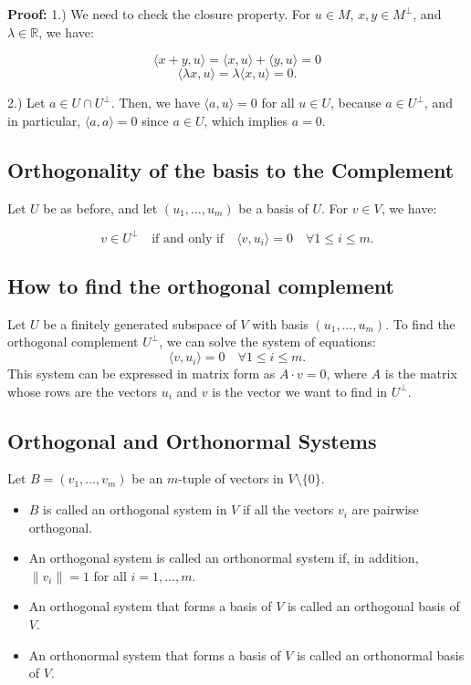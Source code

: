 \textbf{Proof:}
1.) We need to check the closure property. For \( u \in M \), \( x, y \in M^\perp \), and \( \lambda \in \mathbb{R} \), we have:

\[
\langle x + y, u \rangle = \langle x, u \rangle + \langle y, u \rangle = 0
\]
\[
\langle \lambda x, u \rangle = \lambda \langle x, u \rangle = 0.
\]

2.) Let \( a \in U \cap U^\perp \). Then, we have \( \langle a, u \rangle = 0 \) for all \( u \in U \), because \( a \in U^\perp \), and in particular, \( \langle a, a \rangle = 0 \) since \( a \in U \), which implies \( a = 0 \).

\subsection{Orthogonality of the basis to the Complement}

Let \( U \) be as before, and let \( (u_1, \ldots, u_m) \) be a basis of \( U \). For \( v \in V \), we have:

\[
v \in U^\perp \quad \text{if and only if} \quad \langle v, u_i \rangle = 0 \quad \forall 1 \leq i \leq m.
\]

\subsection{How to find the orthogonal complement}
Let \( U \) be a finitely generated subspace of \( V \) with basis \( (u_1, \ldots, u_m) \). To find the orthogonal complement \( U^\perp \), we can solve the system of equations:
\[
\langle v, u_i \rangle = 0 \quad \forall 1 \leq i \leq m.
\]
This system can be expressed in matrix form as \( A \cdot v = 0 \), where \( A \) is the matrix whose rows are the vectors \( u_i \) and \( v \) is the vector we want to find in \( U^\perp \).

\subsection{Orthogonal and Orthonormal Systems}
Let \( B = (v_1, \ldots, v_m) \) be an \( m \)-tuple of vectors in \( V \setminus \{0\} \).
\begin{itemize}[label=\(-\)]
    \item \( B \) is called an orthogonal system in \( V \) if all the vectors \( v_i \) are pairwise orthogonal.
    \item An orthogonal system is called an orthonormal system if, in addition, \( \|v_i\| = 1 \) for all \( i = 1, \ldots, m \).
    \item An orthogonal system that forms a basis of \( V \) is called an orthogonal basis of \( V \).
    \item An orthonormal system that forms a basis of \( V \) is called an orthonormal basis of \( V \).
\end{itemize}

